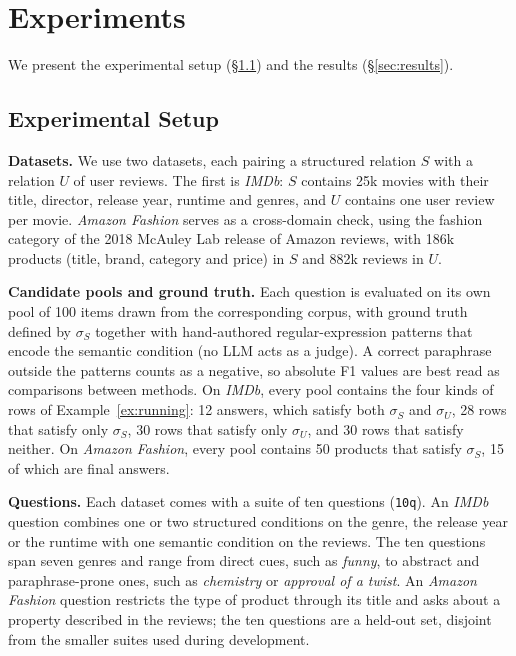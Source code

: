 \documentclass[sigconf]{acmart}
\begin{document}
\section{Experiments}
\label{sec:eval}

We present the experimental setup (\S\ref{sec:setup}) and the results (\S\ref{sec:results}).

\subsection{Experimental Setup}
\label{sec:setup}
\textbf{Datasets.} We use two datasets, each pairing a structured relation $S$ with a relation $U$ of user reviews.
The first is \textit{IMDb}: $S$ contains 25k movies with their title, director, release year, runtime and genres, and $U$ contains one user review per movie.
\textit{Amazon Fashion} serves as a cross-domain check, using the fashion category of the 2018 McAuley Lab release of Amazon reviews, with 186k products (title, brand, category and price) in $S$ and 882k reviews in $U$.

\textbf{Candidate pools and ground truth.} Each question is evaluated on its own pool of 100 items drawn from the corresponding corpus, with ground truth defined by $\sigma_S$ together with hand-authored regular-expression patterns that encode the semantic condition (no LLM acts as a judge). A correct paraphrase outside the patterns counts as a negative, so absolute F1 values are best read as comparisons between methods.
On \textit{IMDb}, every pool contains the four kinds of rows of Example~\ref{ex:running}: 12 answers, which satisfy both $\sigma_S$ and $\sigma_U$, 28 rows that satisfy only $\sigma_S$, 30 rows that satisfy only $\sigma_U$, and 30 rows that satisfy neither.
On \textit{Amazon Fashion}, every pool contains 50 products that satisfy $\sigma_S$, 15 of which are final answers.

\textbf{Questions.} Each dataset comes with a suite of ten questions (\texttt{10q}). An \textit{IMDb} question combines one or two structured conditions on the genre, the release year or the runtime with one semantic condition on the reviews.
The ten questions span seven genres and range from direct cues, such as \emph{funny}, to abstract and paraphrase-prone ones, such as \emph{chemistry} or \emph{approval of a twist}.
An \textit{Amazon Fashion} question restricts the type of product through its title and asks about a property described in the reviews; the ten questions are a held-out set, disjoint from the smaller suites used during development.
\end{document}

